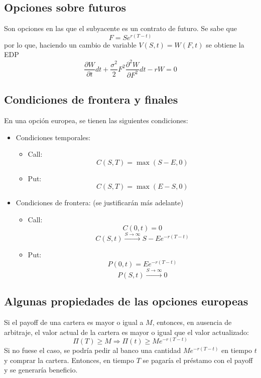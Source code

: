 \subsection{Opciones sobre futuros}
Son opciones en las que el subyacente es un contrato de futuro. Se sabe que
\[
F = Se^{r(T-t)}
\]
por lo que, haciendo un cambio de variable $V(S,t) = W(F,t)$ se obtiene la EDP
\[
\boxed{\frac{\partial W}{\partial t}dt + \frac{\sigma^2}{2}F^2 \frac{\partial^2 W}{\partial F^2}dt - rW    = 0}
\]




\subsection{Condiciones de frontera y finales}
En una opción europea, se tienen las siguientes condiciones:
\begin{itemize}
    \item Condiciones temporales:
    \begin{itemize}
        \item Call:
        \[\boxed{C(S,T) = \max(S-E, 0)}\]
        \item Put:
        \[\boxed{C(S,T) = \max(E-S, 0)}\]
    \end{itemize}
    \item Condiciones de frontera: (se justificarán más adelante)
    \begin{itemize}
        \item Call:
        \[\boxed{C(0,t) = 0}\]
        \[\boxed{C(S,t) \xrightarrow{S\rightarrow\infty}  S - Ee^{-r(T-t)}}\]
        \item Put:
        \[\boxed{P(0,t) = Ee^{-r(T-t)}}\]
        \[\boxed{P(S,t) \xrightarrow{S\rightarrow\infty}  0}\]
    \end{itemize}
\end{itemize}






\subsection{Algunas propiedades de las opciones europeas}

\begin{remark}\label{ActPayoff}
    Si el payoff de una cartera es mayor o igual a $M$, entonces, en ausencia de arbitraje, el valor actual de la cartera es mayor o igual que el valor actualizado:
    \[\boxed{\Pi(T) \geq M \Rightarrow \Pi(t) \geq Me^{-r(T-t)}}\]
    Si no fuese el caso, se podría pedir al banco una cantidad $Me^{-r(T-t)}$ en tiempo $t$ y comprar la cartera. Entonces, en tiempo $T$ se pagaría el préstamo con el payoff y se generaría beneficio.
\end{remark}


